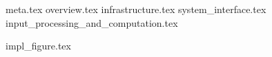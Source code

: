 {meta.tex}
{overview.tex}
{infrastructure.tex}
{system_interface.tex}
{input_processing_and_computation.tex}

{impl_figure.tex}